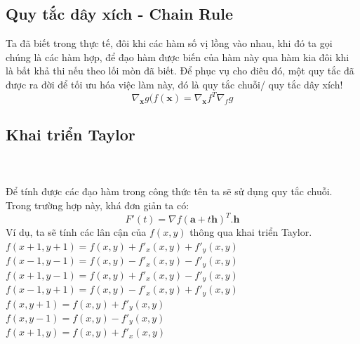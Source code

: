\documentclass{article}
\begin{document}
\subsection{Quy tắc dây xích - Chain Rule}
Ta đã biết trong thực tế, đôi khi các hàm số vị lồng vào nhau, khi đó ta gọi chúng là các hàm hợp, để đạo hàm được biến của hàm này qua hàm kia đôi khi là bất khả thi nếu theo lối mòn đã biết. Để phục vụ cho điêu đó, một quy tắc đã được ra đời để tối ưu hóa việc làm này, đó là quy tắc chuỗi/ quy tắc dây xích!
\begin{equation}
    \nabla_{\textbf{x}} g(f(\textbf{x}) = \nabla_{\textbf{x}}{f}^{T} \nabla_{f}{g}
\end{equation}
\subsection{Khai triển Taylor}
\label{n2}
\\\\
Để tính được các đạo hàm trong công thức tên ta sẽ sử dụng quy tắc chuỗi. Trong trường hợp này, khá đơn giản ta có:
$$F'(t) = \nabla {f(\textbf{a}+t\textbf{h})^{T}.\textbf{h}}$$
Ví dụ, ta sẽ tính các lân cận của $f(x,y)$ thông qua khai triển Taylor.\\
$f(x+1,y+1) = f(x,y)+f'_{x}(x,y)+f'_{y}(x,y)$\\
$f(x-1,y-1) = f(x,y)-f'_{x}(x,y)-f'_{y}(x,y)$\\
$f(x+1,y-1) = f(x,y)+f'_{x}(x,y)-f'_{y}(x,y)$\\
$f(x-1,y+1) = f(x,y)-f'_{x}(x,y)+f'_{y}(x,y)$\\
$f(x,y+1) = f(x,y)+f'_{y}(x,y)$\\
$f(x,y-1) = f(x,y)-f'_{y}(x,y)$\\
$f(x+1,y) = f(x,y)+f'_{x}(x,y)$\\
\end{document}
